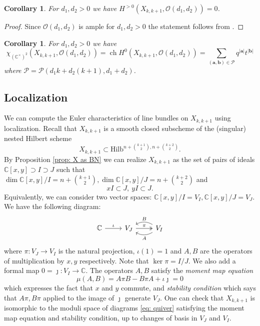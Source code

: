 \documentclass[12pt]{amsart}
\newcommand{\Hilb}{\mathrm{Hilb}}
\newcommand{\C}{\mathbb{C}}
\newcommand{\CP}{\mathcal{P}}
\newcommand{\CO}{\mathcal{O}}
\DeclareMathOperator{\ch}{ch}
\newcommand{\aaa}{\mathbf{a}}
\newcommand{\bbb}{\mathbf{b}}
\numberwithin{equation}{section}
\newtheorem{corollary}[theorem]{Corollary}
\theoremstyle{definition}
\begin{document}
\begin{corollary}
  For \(d_1,d_2>0\) we have \( H^{>0}(X_{k,k+1},\CO(d_1,d_2))=0\).
\end{corollary}
\begin{proof} Since \(\CO(d_1,d_2)\) is ample for \(d_1,d_2>0\) the statement follows from \cite[Theorem 1.2.8]{FrobBook}.
  \end{proof}

 

\begin{corollary}
\label{cor: euler char}
For $d_1,d_2>0$ we have
$$
\chi_{(\C^{\times})^2}(X_{k,k+1},\CO(d_1,d_2))=\ch H^0(X_{k,k+1},\CO(d_1,d_2))=\sum_{(\aaa,\bbb)\in \CP}q^{|\aaa|}t^{|\bbb|}
$$
where $\CP=\CP(d_1k+d_2(k+1),d_1+d_2)$.
\end{corollary}



\subsection{Localization}

We can compute the Euler characteristics of line bundles on $X_{k,k+1}$ using localization. Recall that $X_{k,k+1}$ is a smooth closed subscheme of the (singular) nested Hilbert scheme
$$
X_{k,k+1}\subset \Hilb^{n+\binom{k+1}{2},n+\binom{k+2}{2}}.
$$
By Proposition \ref{prop: X as BN} we can realize $X_{k,k+1}$ as the set of pairs of ideals $\C[x,y]\supset I\supset J$ such that 
$\dim \C[x,y]/I=n+\binom{k+1}{2},\dim \C[x,y]/J=n+\binom{k+2}{2}$ and 
$$
xI\subset J,\ yI\subset J.
$$
Equivalently, we can consider  two vector spaces:
$\C[x,y]/I=V_I, \C[x,y]/J=V_J$.
We have the following diagram:
\begin{equation}
\label{eq: quiver}
\begin{tikzcd}
\C \arrow{r}{\iota} & V_J \arrow[twoheadrightarrow]{r}{\pi} & V_I \arrow[bend left]{l}{A} \arrow[bend right,swap]{l}{B}  
\end{tikzcd}
\end{equation}
where $\pi:V_J\to V_I$ is the natural projection, $\iota(1)=1$ and $A,B$ are the operators of multiplication by $x,y$ respectively.  Note that $\ker \pi=I/J$. We also add a formal map $0=\jmath:V_I\to \C$. The operators $A,B$ satisfy the {\em moment map equation}
$$
\mu(A,B)=A\pi B-B\pi A+\iota\jmath=0
$$
which expresses the fact that $x$ and $y$ commute, and {\em stability condition} which says that $A\pi, B\pi$ applied to the image of $\jmath$ generate $V_J$. One can check \cite{GGS} that $X_{k,k+1}$ is isomorphic to the moduli space of diagrams \eqref{eq: quiver} satisfying the moment map equation and stability condition, up to changes of basis in $V_J$ and $V_I$.  
\end{document}
